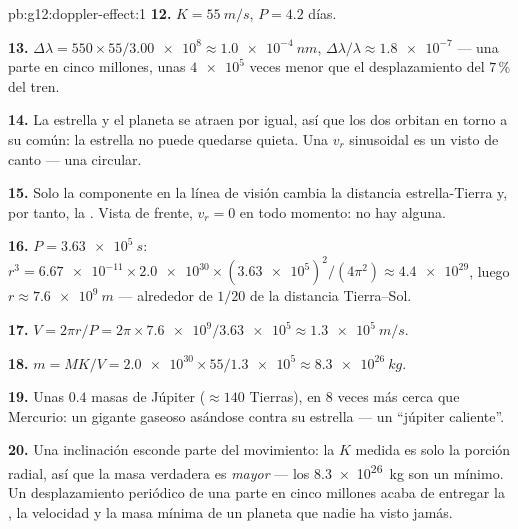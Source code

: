\begin{solution}{pb:g12:doppler-effect:1}
\textbf{12.} $K = \qty{55}{m/s}$, $P = 4.2$ días.

\textbf{13.} $\Delta\lambda = 550 \times 55/\num{3.00e8} \approx
\qty{1.0e-4}{nm}$, $\Delta\lambda/\lambda \approx \num{1.8e-7}$ --- una
parte en cinco millones, unas $\num{4e5}$ veces menor que el
desplazamiento del $7\,\%$ del tren.

\textbf{14.} La estrella y el planeta se atraen por igual, así que los
dos orbitan en torno a su  común: la estrella no puede
quedarse quieta. Una $v_r$ sinusoidal es un 
visto de canto --- una  circular.

\textbf{15.} Solo la componente en la línea de visión cambia la
distancia estrella-Tierra y, por tanto, la . Vista de
frente, $v_r = 0$ en todo momento: no hay  alguna.

\textbf{16.} $P = \qty{3.63e5}{s}$:
$r^3 = \num{6.67e-11} \times \num{2.0e30} \times
(\num{3.63e5})^2/(4\pi^2) \approx \num{4.4e29}$, luego
$r \approx \qty{7.6e9}{m}$ --- alrededor de $1/20$ de la distancia
Tierra--Sol.

\textbf{17.} $V = 2\pi r/P = 2\pi \times \num{7.6e9}/\num{3.63e5}
\approx \qty{1.3e5}{m/s}$.

\textbf{18.} $m = M K/V = \num{2.0e30} \times 55/\num{1.3e5} \approx
\qty{8.3e26}{kg}$.

\textbf{19.} Unas $0.4$ masas de Júpiter ($\approx 140$ Tierras), en
 $8$ veces más cerca que Mercurio: un gigante gaseoso asándose
contra su estrella --- un ``júpiter caliente''.

\textbf{20.} Una inclinación esconde parte del movimiento: la $K$ medida
es solo la porción radial, así que la masa verdadera es \emph{mayor} ---
los \qty{8.3e26}{kg} son un mínimo. Un desplazamiento periódico de una
parte en cinco millones acaba de entregar la , la velocidad y la
masa mínima de un planeta que nadie ha visto jamás.
\end{solution}
